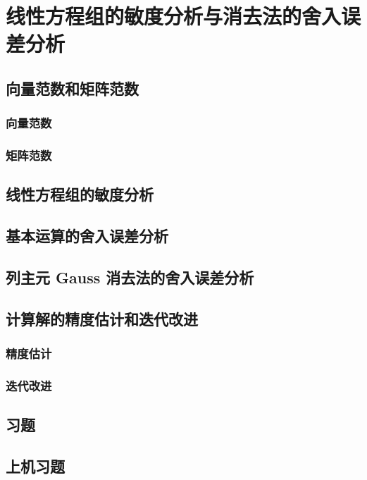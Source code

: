 \chapter{线性方程组的敏度分析与消去法的舍入误差分析}

\section{向量范数和矩阵范数}

\subsection{向量范数}

\pending

\subsection{矩阵范数}

\pending

\section{线性方程组的敏度分析}

\pending

\section{基本运算的舍入误差分析}

\pending

\section{列主元 Gauss 消去法的舍入误差分析}

\pending

\section{计算解的精度估计和迭代改进}

\subsection{精度估计}

\pending

\subsection{迭代改进}

\pending

\section{习题}

\pending

\section{上机习题}

\pending
